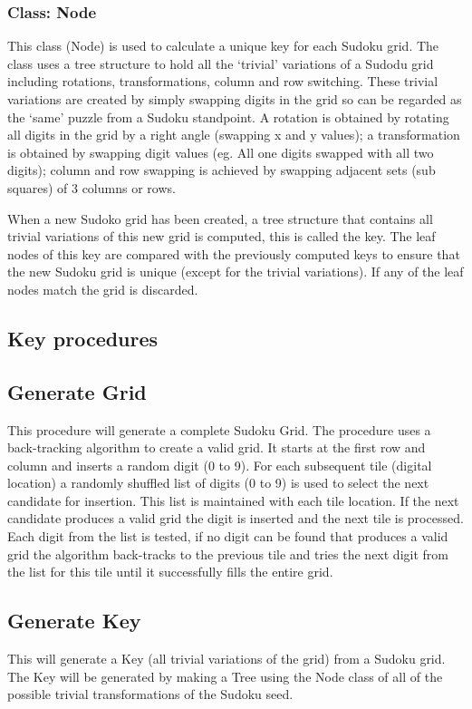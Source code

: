 \documentclass[fleqn]{article}
\begin{document}
\subsubsection{Class: Node}
This class (Node) is used to calculate a unique key for each Sudoku grid. The class uses a tree structure to hold all the ‘trivial’ variations of a Sudodu grid including rotations, transformations, column and row switching. These trivial variations are created by simply swapping digits in the grid so can be regarded as the ‘same’ puzzle from a Sudoku standpoint. A rotation is obtained by rotating all digits in the grid by a right angle (swapping x and y values); a transformation is obtained by swapping digit values (eg. All one digits swapped with all two digits); column and row swapping is achieved by swapping adjacent sets (sub squares) of 3 columns or rows.

When a new Sudoko grid has been created, a tree structure that contains all trivial variations of this new grid is computed, this is called the key. The leaf nodes of this key are compared with the previously computed keys to ensure that the new Sudoku grid is unique (except for the trivial variations). If any of the leaf nodes match the grid is discarded.


\subsection{Key procedures}

\subsection{Generate Grid}
This procedure will generate a complete Sudoku Grid.
The procedure uses a back-tracking algorithm to create a valid grid. It starts at the first row and column and inserts a random digit (0 to 9). For each subsequent tile (digital location) a randomly shuffled list of digits (0 to 9) is used to select the next candidate for insertion. This list is maintained with each tile location. If the next candidate produces a valid grid the digit is inserted and the next tile is processed. Each digit from the list is tested, if no digit can be found that produces a valid grid the algorithm back-tracks to the previous tile and tries the next digit from the list for this tile until it successfully fills the entire grid. 

\subsection{Generate Key}
This will generate a Key (all trivial variations of the grid) from a Sudoku grid. The Key will be generated by making a Tree using the Node class of all of the possible trivial transformations of the Sudoku seed.
\end{document}
